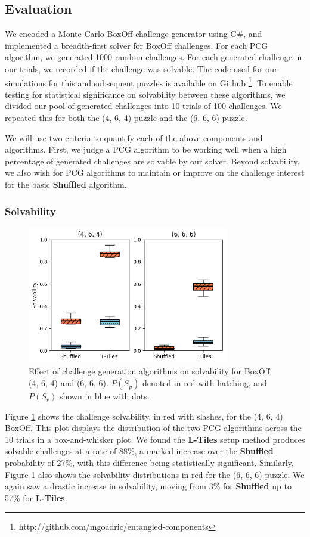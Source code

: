 \documentclass[journal]{IEEEtran}
\begin{document}
\subsection{Evaluation}
\noindent
We encoded a Monte Carlo BoxOff challenge generator using C\#, and implemented a breadth-first solver for BoxOff challenges. For each PCG algorithm, we generated 1000 random challenges. For each generated challenge in our trials, we recorded if the challenge was solvable. The code used for our simulations for this and subsequent puzzles is available on Github \footnote{http://github.com/mgoadric/entangled-components}. 
To enable testing for statistical significance on solvability between these algorithms, we divided our pool of generated challenges into 10 trials of 100 challenges. We repeated this for both the (4, 6, 4) puzzle and the (6, 6, 6) puzzle.
 
We will use two criteria to quantify each of the above components and algorithms.
First, we judge a PCG algorithm to be working well when a high percentage of generated challenges are solvable by our solver. Beyond solvability, we also wish for PCG algorithms to maintain or improve on the challenge interest for the basic \textbf{Shuffled} algorithm. 

\subsubsection{Solvability}

\begin{figure}[t]
\includegraphics[width=8.8cm]{figure7.png}
\caption{Effect of challenge generation algorithms on solvability for BoxOff (4, 6, 4) and (6, 6, 6). $P(S_p)$ denoted in red with hatching, and $P(S_r)$ shown in blue with dots.}
\label{fig:boxoffsolvediff}
\end{figure}

Figure \ref{fig:boxoffsolvediff} shows the challenge solvability, in red with slashes, for the (4, 6, 4) BoxOff. This plot displays the distribution of the two PCG algorithms across the 10 trials in a box-and-whisker plot.  
We found the {\bf L-Tiles} setup method produces solvable challenges at a rate of 88\%, a marked increase over the {\bf Shuffled} probability of 27\%, with this difference being statistically significant.
Similarly, Figure \ref{fig:boxoffsolvediff} also shows the solvability distributions in red for the (6, 6, 6) puzzle. We again saw a drastic increase in solvability, moving from 3\% for {\bf Shuffled} up to 57\% for {\bf L-Tiles}. 
\end{document}
